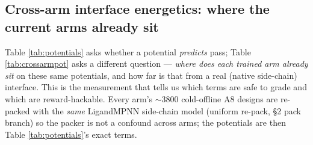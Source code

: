 \documentclass[11pt]{article}
\begin{document}
\subsection{Cross-arm interface energetics: where the current arms already sit}
\label{sec:crossarm-pot}
Table \ref{tab:potentials} asks whether a potential \emph{predicts} pass; Table
\ref{tab:crossarmpot} asks a different question --- \emph{where does each trained arm already sit} on
these same potentials, and how far is that from a real (native side-chain) interface. This is the
measurement that tells us which terms are safe to grade and which are reward-hackable. Every arm's
$\sim\!3800$ cold-offline A8 designs are re-packed with the \emph{same} LigandMPNN side-chain model
(uniform re-pack, \S2 pack branch) so the packer is not a confound across arms; the potentials are
then Table \ref{tab:potentials}'s exact terms.
\end{document}
